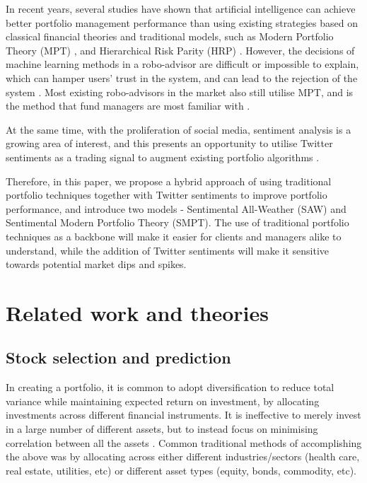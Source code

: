 \documentclass{article}
\begin{document}
In recent years, several studies \cite{GOMES200143} have shown that artificial intelligence can achieve better portfolio management performance than using existing strategies based on classical financial theories and traditional models, such as Modern Portfolio Theory (MPT) \cite{markowitz_1991}, and Hierarchical Risk Parity (HRP) \cite{hrp}. However, the decisions of machine learning methods in a robo-advisor are difficult or impossible to explain, which can hamper users’ trust in the system, and can lead to the rejection of the system \cite{rai2020explainable}. Most existing robo-advisors in the market also still utilise MPT, and is the method that fund managers are most familiar with \cite{lam2016robo}.

At the same time, with the proliferation of social media, sentiment analysis is a growing area of interest, and this presents an opportunity to utilise Twitter sentiments as a trading signal to augment existing portfolio algorithms \cite{peterson2016trading}.

Therefore, in this paper, we propose a hybrid approach of using traditional portfolio techniques together with Twitter sentiments to improve portfolio performance, and introduce two models - Sentimental All-Weather (SAW) and Sentimental Modern Portfolio Theory (SMPT). The use of traditional portfolio techniques as a backbone will make it easier for clients and managers alike to understand, while the addition of Twitter sentiments will make it sensitive towards potential market dips and spikes.

\section{Related work and theories}
\subsection{Stock selection and prediction}
\label{stock_selection}

In creating a portfolio, it is common to adopt diversification to reduce total variance while maintaining expected return on investment, by allocating investments across different financial instruments. It is ineffective to merely invest in a large number of different assets, but to instead focus on minimising correlation between all the assets \cite{diversification}. Common traditional methods of accomplishing the above was by allocating across either different industries/sectors (health care, real estate, utilities, etc) or different asset types (equity, bonds, commodity, etc).
\end{document}
